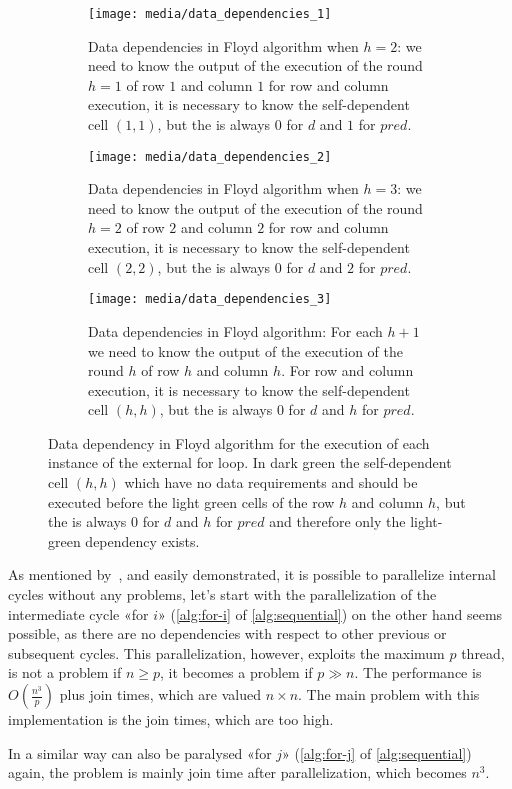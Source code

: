 \begin{figure}[htbp]
    \centering
    \begin{subfigure}[t]{0.3\textwidth}
        \centering
        \texttt{[image: media/data\_dependencies\_1]}
        \caption{Data dependencies in Floyd algorithm when \(h=2\): we need to know the output of the execution of the round \(h=1\) of row \(1\) and column \(1\) for row and column execution, it is necessary to know the self-dependent cell \((1,1)\), but the is always \(0\) for \(d\) and \(1\) for \(pred\).}
        \label{fig:data-dependencies-1}
    \end{subfigure}
    \hfill
    \begin{subfigure}[t]{0.3\textwidth}
        \centering
        \texttt{[image: media/data\_dependencies\_2]}
        \caption{Data dependencies in Floyd algorithm when \(h=3\): we need to know the output of the execution of the round \(h=2\) of row \(2\) and column \(2\) for row and column execution, it is necessary to know the self-dependent cell \((2,2)\), but the is always \(0\) for \(d\) and \(2\) for \(pred\).}
        \label{fig:data-dependencies-2}
    \end{subfigure}
    \hfill
    \begin{subfigure}[t]{0.3\textwidth}
        \centering
        \texttt{[image: media/data\_dependencies\_3]}
        \caption{Data dependencies in Floyd algorithm: For each \(h+1\) we need to know the output of the execution of the round \(h\) of row \(h\) and column \(h\). For row and column execution, it is necessary to know the self-dependent cell \((h,h)\), but the is always \(0\) for \(d\) and \(h\) for \(pred\).}
        \label{fig:data-dependencies-3}
    \end{subfigure}
    \caption{Data dependency in Floyd algorithm for the execution of each instance of the external for loop. In dark green the self-dependent cell \((h,h)\) which have no data requirements and should be executed before the light green cells of the row \(h\) and column \(h\), but the is always \(0\) for \(d\) and \(h\) for \(pred\) and therefore only the light-green dependency exists.}
    \label{fig:data-dependency-external-loop}
\end{figure}

As mentioned by~\cite{rucci}, and easily demonstrated, it is possible to parallelize internal cycles without any problems, let's start with the parallelization of  the intermediate cycle «for \(i\)» (\cref{alg:for-i} of \cref{alg:sequential}) on the other hand seems possible, as there are no dependencies with respect to other previous or subsequent cycles.
This parallelization, however, exploits the maximum \(p\) thread, is not a problem if \(n \geq p\), it becomes a problem if \(p \gg n\).
The performance is \(\displaystyle O\left(\frac{n^3}{p}\right)\) plus join times, which are valued \(n\times n\).
The main problem with this implementation is the join times, which are too high.

In a similar way can also be paralysed «for \(j\)» (\cref{alg:for-j} of \cref{alg:sequential}) again, the problem is mainly join time after parallelization, which becomes \(n^3\).

\FloatBarrier